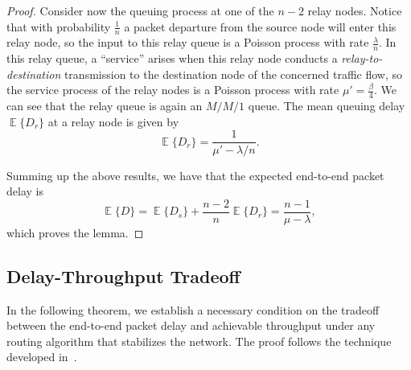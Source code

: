 \documentclass[twocolumn, 10pt]{svjour3}         \smartqed  \usepackage{graphicx}
\DeclareMathOperator*{\E}{\mathbb{E}}
\begin{document}
\begin{proof}
Consider now the queuing process at one of the $n-2$ relay nodes.
Notice that with probability $\frac{1}{n}$ a packet departure from the source node will enter this relay node, so the input to this relay queue is a Poisson process with rate $\frac{\lambda}{n}$.
In this relay queue, a ``service'' arises when this relay node conducts a \emph{relay-to-destination} transmission to the destination node of the concerned traffic flow, so the service process of the relay nodes is a Poisson process with rate $\mu' = \frac{\beta}{4}$.
We can see that the relay queue is again an $M/M/1$ queue.
The mean queuing delay $\E\{D_r\}$ at a relay node is given by
\begin{equation}
	\E\{D_r\} = \frac{1}{\mu'-\lambda/n}.
\end{equation}

Summing up the above results, we have that the expected end-to-end packet delay is 
\begin{equation}
	\E\{D\} = \E\{D_s\} + \frac{n-2}{n} \E\{D_r\} = \frac{n-1}{\mu-\lambda},
\end{equation}
which proves the lemma.
\end{proof}





\subsection{Delay-Throughput Tradeoff}\label{sec:tradeoff}
In the following theorem, we establish a necessary condition on the tradeoff between the end-to-end packet delay and achievable throughput  under any routing algorithm  that stabilizes the network. The proof follows the  technique developed in~\cite{Neely2005}.
\end{document}
